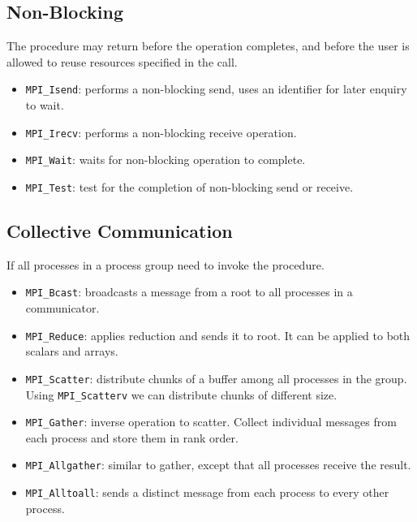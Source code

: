 \subsection*{Non-Blocking}
The procedure may return before the operation completes, and before the user is allowed to reuse resources specified in the call.
\begin{itemize}
    \item \texttt{MPI\_Isend}: performs a non-blocking send, uses an identifier for later enquiry to wait.
    \item \texttt{MPI\_Irecv}: performs a non-blocking receive operation.
    \item \texttt{MPI\_Wait}: waits for non-blocking operation to complete.
    \item \texttt{MPI\_Test}: test for the completion of non-blocking send or receive.
\end{itemize}

\subsection{Collective Communication}
If all processes in a process group need to invoke the procedure.
\begin{itemize}
    \item \texttt{MPI\_Bcast}: broadcasts a message from a root to all processes in a communicator.
    \item \texttt{MPI\_Reduce}: applies reduction and sends it to root.
        It can be applied to both scalars and arrays.
    \item \texttt{MPI\_Scatter}: distribute chunks of a buffer among all processes in the group.
        Using \texttt{MPI\_Scatterv} we can distribute chunks of different size.
    \item \texttt{MPI\_Gather}: inverse operation to scatter.
        Collect individual messages from each process and store them in rank order.
    \item \texttt{MPI\_Allgather}: similar to gather, except that all processes receive the result.
    \item \texttt{MPI\_Alltoall}: sends a distinct message from each process to every other process.
\end{itemize}
